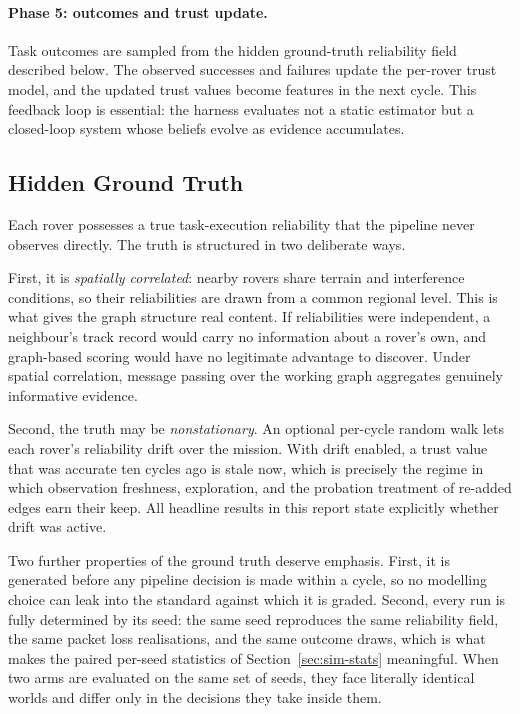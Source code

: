 \paragraph{Phase 5: outcomes and trust update.} Task outcomes are sampled
from the hidden ground-truth reliability field described below. The
observed successes and failures update the per-rover trust model, and the
updated trust values become features in the next cycle. This feedback
loop is essential: the harness evaluates not a static estimator but a
closed-loop system whose beliefs evolve as evidence accumulates.

\subsection{Hidden Ground Truth}

Each rover possesses a true task-execution reliability that the pipeline
never observes directly. The truth is structured in two deliberate ways.

First, it is \emph{spatially correlated}: nearby rovers share terrain and
interference conditions, so their reliabilities are drawn from a common
regional level. This is what gives the graph structure real content. If
reliabilities were independent, a neighbour's track record would carry no
information about a rover's own, and graph-based scoring would have no
legitimate advantage to discover. Under spatial correlation, message
passing over the working graph aggregates genuinely informative evidence.

Second, the truth may be \emph{nonstationary}. An optional per-cycle
random walk lets each rover's reliability drift over the mission. With
drift enabled, a trust value that was accurate ten cycles ago is stale
now, which is precisely the regime in which observation freshness,
exploration, and the probation treatment of re-added edges earn their
keep. All headline results in this report state explicitly whether drift
was active.

Two further properties of the ground truth deserve emphasis. First, it
is generated before any pipeline decision is made within a cycle, so no
modelling choice can leak into the standard against which it is graded.
Second, every run is fully determined by its seed: the same seed
reproduces the same reliability field, the same packet loss realisations,
and the same outcome draws, which is what makes the paired per-seed
statistics of Section~\ref{sec:sim-stats} meaningful. When two arms are
evaluated on the same set of seeds, they face literally identical worlds
and differ only in the decisions they take inside them.

